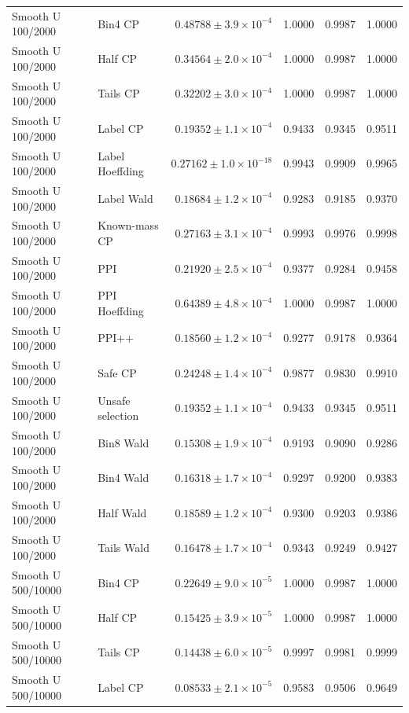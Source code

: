 \begin{longtable}{llrrrr}
Smooth U 100/2000 & Bin4 CP & $0.48788\pm 3.9\times 10^{-4}$ & 1.0000 & 0.9987 & 1.0000 \\
Smooth U 100/2000 & Half CP & $0.34564\pm 2.0\times 10^{-4}$ & 1.0000 & 0.9987 & 1.0000 \\
Smooth U 100/2000 & Tails CP & $0.32202\pm 3.0\times 10^{-4}$ & 1.0000 & 0.9987 & 1.0000 \\
Smooth U 100/2000 & Label CP & $0.19352\pm 1.1\times 10^{-4}$ & 0.9433 & 0.9345 & 0.9511 \\
Smooth U 100/2000 & Label Hoeffding & $0.27162\pm 1.0\times 10^{-18}$ & 0.9943 & 0.9909 & 0.9965 \\
Smooth U 100/2000 & Label Wald & $0.18684\pm 1.2\times 10^{-4}$ & 0.9283 & 0.9185 & 0.9370 \\
Smooth U 100/2000 & Known-mass CP & $0.27163\pm 3.1\times 10^{-4}$ & 0.9993 & 0.9976 & 0.9998 \\
Smooth U 100/2000 & PPI & $0.21920\pm 2.5\times 10^{-4}$ & 0.9377 & 0.9284 & 0.9458 \\
Smooth U 100/2000 & PPI Hoeffding & $0.64389\pm 4.8\times 10^{-4}$ & 1.0000 & 0.9987 & 1.0000 \\
Smooth U 100/2000 & PPI++ & $0.18560\pm 1.2\times 10^{-4}$ & 0.9277 & 0.9178 & 0.9364 \\
Smooth U 100/2000 & Safe CP & $0.24248\pm 1.4\times 10^{-4}$ & 0.9877 & 0.9830 & 0.9910 \\
Smooth U 100/2000 & Unsafe selection & $0.19352\pm 1.1\times 10^{-4}$ & 0.9433 & 0.9345 & 0.9511 \\
Smooth U 100/2000 & Bin8 Wald & $0.15308\pm 1.9\times 10^{-4}$ & 0.9193 & 0.9090 & 0.9286 \\
Smooth U 100/2000 & Bin4 Wald & $0.16318\pm 1.7\times 10^{-4}$ & 0.9297 & 0.9200 & 0.9383 \\
Smooth U 100/2000 & Half Wald & $0.18589\pm 1.2\times 10^{-4}$ & 0.9300 & 0.9203 & 0.9386 \\
Smooth U 100/2000 & Tails Wald & $0.16478\pm 1.7\times 10^{-4}$ & 0.9343 & 0.9249 & 0.9427 \\
Smooth U 500/10000 & Bin4 CP & $0.22649\pm 9.0\times 10^{-5}$ & 1.0000 & 0.9987 & 1.0000 \\
Smooth U 500/10000 & Half CP & $0.15425\pm 3.9\times 10^{-5}$ & 1.0000 & 0.9987 & 1.0000 \\
Smooth U 500/10000 & Tails CP & $0.14438\pm 6.0\times 10^{-5}$ & 0.9997 & 0.9981 & 0.9999 \\
Smooth U 500/10000 & Label CP & $0.08533\pm 2.1\times 10^{-5}$ & 0.9583 & 0.9506 & 0.9649 \\

\end{longtable}
